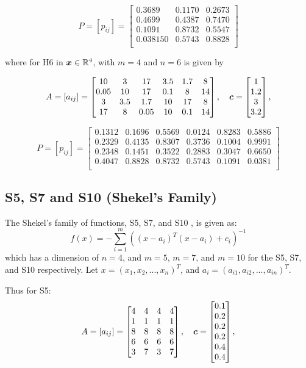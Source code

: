 $$
P=[p_{ij}] = \begin{bmatrix}
0.3689 & 0.1170 & 0.2673 \\
0.4699 & 0.4387 & 0.7470 \\
0.1091 & 0.8732 & 0.5547 \\
0.038150 & 0.5743 & 0.8828 \\
\end{bmatrix}
$$

where for H6 in $\boldsymbol{x}\in\mathbb{R}^4$, with $m=4$ and $n=6$ is given by

$$
A=[a_{ij}] = \begin{bmatrix}
10 & 3 & 17 & 3.5 & 1.7 & 8\\
0.05 & 10 & 17 & 0.1 & 8 & 14  \\
3 & 3.5 & 1.7 & 10 & 17 & 8 \\
17 & 8 & 0.05 & 10 & 0.1 & 14 
\end{bmatrix},
\quad
\boldsymbol{c} = \begin{bmatrix} 1 \\ 1.2 \\ 3 \\ 3.2 \end{bmatrix},
$$

$$
P=[p_{ij}] = \begin{bmatrix}
0.1312 & 0.1696 & 0.5569 & 0.0124 & 0.8283 & 0.5886 \\
0.2329 & 0.4135 & 0.8307 & 0.3736 & 0.1004 & 0.9991 \\
0.2348 & 0.1451 & 0.3522 & 0.2883 & 0.3047 & 0.6650\\
0.4047 & 0.8828 & 0.8732 & 0.5743 & 0.1091 & 0.0381 \\
\end{bmatrix}
$$

\subsection{S5, S7 and S10 (Shekel's Family)}
The Shekel's family of functions, S5, S7, and S10 \cite{dekkers}, is given as:
$$f(x) = -\sum_{i=1}^m ((x-a_i)^T(x-a_i)+c_i)^{-1}$$
which has a dimension of $n=4$, and $m=5$, $m=7$, and $m=10$ for the S5, S7, and S10 respectively. Let $x = (x_1, x_2, ..., x_n)^T$, and $a_i = (a_{i1}, a_{i2}, ..., a_{in})^T$. \vspace{5pt}

Thus for S5:
$$
A=[a_{ij}] = \begin{bmatrix}
4 & 4 & 4 & 4 \\
1 & 1 & 1 & 1 \\
8 & 8 & 8 & 8 \\
6 & 6 & 6 & 6 \\
3 & 7 & 3 & 7 \\
\end{bmatrix},
\quad
\boldsymbol{c} = \begin{bmatrix} 0.1 \\ 0.2 \\ 0.2 \\ 0.2 \\ 0.4 \\ 0.4 \end{bmatrix},
$$

